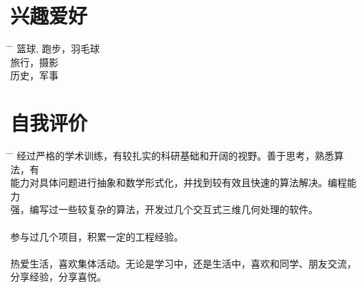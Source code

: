 \documentclass[20pt]{article} %
\begin{document}

\section{兴趣爱好}
\begin{tabbing}%
\hspace{5mm} \= \hspace{14cm} \= \kill %
\sqbullet \> {篮球, 跑步，羽毛球 } \\%
\sqbullet \> {旅行，摄影}\\
\sqbullet \> {历史，军事}
\end{tabbing}%

\section{自我评价}

\begin{tabbing}%
\hspace{5mm} \= \hspace{14cm} \= \kill %
\sqbullet \> {经过严格的学术训练，有较扎实的科研基础和开阔的视野。善于思考，熟悉算法，有}\\
\> {能力对具体问题进行抽象和数学形式化，并找到较有效且快速的算法解决。编程能力}\\
\> {强，编写过一些较复杂的算法，开发过几个交互式三维几何处理的软件。} \\%
\\
\sqbullet \> {参与过几个项目，积累一定的工程经验。}\\
\\
\sqbullet \> {热爱生活，喜欢集体活动。无论是学习中，还是生活中，喜欢和同学、朋友交流，}\\
\> {分享经验，分享喜悦。}
\end{tabbing}%




\end{document}
